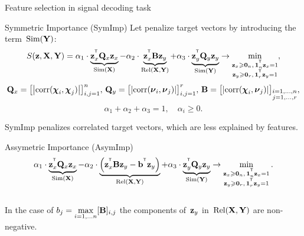 \documentclass[10pt]{beamer}
\begin{document}
\begin{frame}{Feature selection in signal decoding task}
	\begin{block}{Symmetric Importance (SymImp)}
	Let penalize target vectors by introducing the term~$\text{Sim} (\bY)$:
	\[
	S(\bz, \bX, \bY) = \alpha_1 \cdot \underbrace{\bz_x^{\T} \bQ_x \bz_x}_{\text{Sim}(\bX)} - \alpha_2 \cdot \underbrace{\bz_x^{\T} \bB \bz_y}_{\text{Rel}(\bX, \bY)} + \alpha_3 \cdot \underbrace{\bz_y^{\T} \bQ_y \bz_y}_{\text{Sim}(\bY)} \rightarrow \min_{\substack{\bz_x \geq \bZero_n, \, \bOne_n^{\T}\bz_x=1 \\ \bz_y \geq \bZero_r, \, \bOne_r^{\T}\bz_y=1}},
	\]
	\[
	\bQ_x = \bigl[ \left| \text{corr}(\bchi_i, \bchi_j) \right| \bigr]_{i,j=1}^n, \,
	\bQ_y = \bigl[ \left| \text{corr}(\bnu_i, \bnu_j) \right| \bigr]_{i,j=1}^r, \,
	\bB =  \bigl[ \left| \text{corr}(\bchi_i, \bnu_j) \right| \bigr]_{\substack{i=1, \dots, n \\ j=1, \dots, r}},
	\]
	\[
	\alpha_1 + \alpha_2 + \alpha_3 = 1, \quad \alpha_i \geq 0.
	\] 
	\end{block}
	SymImp penalizes correlated target vectors, which are less explained by features.
		
	\begin{block}{Assymetric Importance (AsymImp)}
		\vspace{-0.2cm}
		\begin{equation*}
		\alpha_1 \cdot \underbrace{\bz_x^{\T} \bQ_x \bz_x}_{\text{Sim}(\bX)} - \alpha_2 \cdot  \underbrace{\left(\bz_x^{\T} \bB \bz_y - \bb^{\T} \bz_y \right) }_{\text{Rel}(\bX, \bY)} + \alpha_3 \cdot \underbrace{\bz_y^{\T} \bQ_y \bz_y}_{\text{Sim}(\bY)} \rightarrow \min_{\substack{\bz_x \geq \bZero_n, \, \bOne_n^{\T}\bz_x=1 \\ \bz_y \geq \bZero_r, \, \bOne_r^{\T}\bz_y=1}}.
		\end{equation*}
		\vspace{-0.4cm} \\
		In the case of $b_j = \max\limits_{i=1, \dots n} [\bB]_{i, j}$ the components of~$\bz_y$ in~$\text{Rel}(\bX, \bY)$ are non-negative.
	\end{block}
\end{frame}
\end{document}
